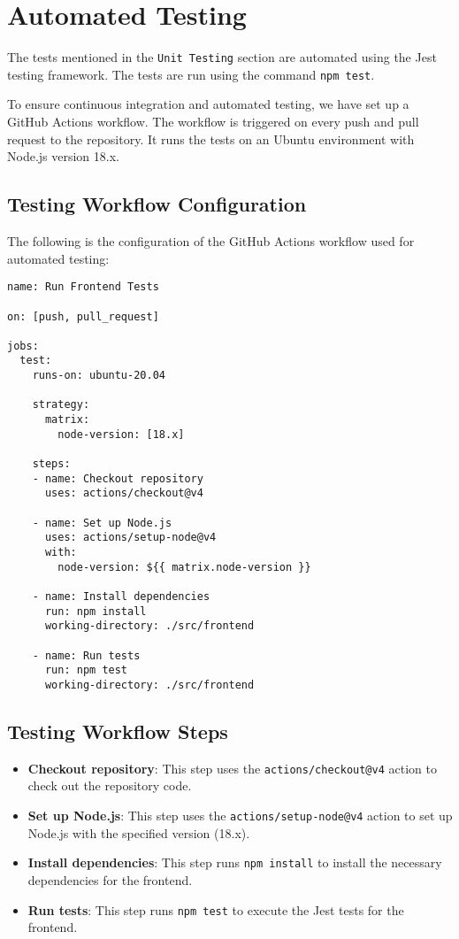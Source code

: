 \documentclass[12pt, titlepage]{article}
\begin{document}
\section{Automated Testing}
The tests mentioned in the \texttt{Unit Testing} section are automated using the Jest testing framework. The tests are run using the command \texttt{npm test}.

To ensure continuous integration and automated testing, we have set up a GitHub Actions workflow. The workflow is triggered on every push and pull request to the repository. It runs the tests on an Ubuntu environment with Node.js version 18.x.

\subsection{Testing Workflow Configuration}

The following is the configuration of the GitHub Actions workflow used for automated testing:

\begin{verbatim}
name: Run Frontend Tests

on: [push, pull_request]

jobs:
  test:
    runs-on: ubuntu-20.04

    strategy:
      matrix:
        node-version: [18.x]

    steps:
    - name: Checkout repository
      uses: actions/checkout@v4

    - name: Set up Node.js
      uses: actions/setup-node@v4
      with:
        node-version: ${{ matrix.node-version }}

    - name: Install dependencies
      run: npm install
      working-directory: ./src/frontend

    - name: Run tests
      run: npm test
      working-directory: ./src/frontend
\end{verbatim}

\subsection{Testing Workflow Steps}

\begin{itemize}
    \item \textbf{Checkout repository}: This step uses the \texttt{actions/checkout@v4} action to check out the repository code.
    \item \textbf{Set up Node.js}: This step uses the \texttt{actions/setup-node@v4} action to set up Node.js with the specified version (18.x).
    \item \textbf{Install dependencies}: This step runs \texttt{npm install} to install the necessary dependencies for the frontend.
    \item \textbf{Run tests}: This step runs \texttt{npm test} to execute the Jest tests for the frontend.
\end{itemize}
\end{document}
